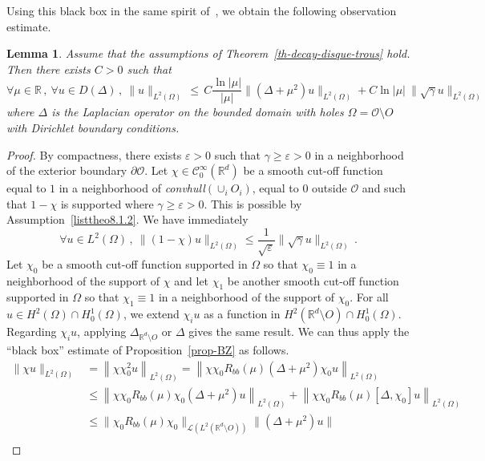 \documentclass[10pt]{amsart}
\newtheorem{lemm}[theo]{Lemma}\newtheorem{prop}[theo]{Proposition}\newtheorem{coro}[theo]{Corollary}\newtheorem{conj}[theo]{Conjecture}
\theoremstyle{definition}\newtheorem{defi}[theo]{Definition}\newtheorem{rema}[theo]{Remark}\newtheorem{exam}[theo]{Example}\newtheorem{exem}[theo]{Example}\newtheorem{nota}[theo]{Notation}
\newcommand{\RR}{\mathbb{R}}
\newcommand{\Cc}{\mathcal{C}}
\newcommand{\Lc}{\mathcal{L}}
\newcommand{\Oc}{\mathcal{O}}
\let\oldforall\forall
\renewcommand*{\forall}{\mathrel{\oldforall}}
\begin{document}
Using this black box in the same spirit of~\cite{Burq-Zworski}, we obtain the following observation estimate.

\begin{lemm}\label{lemma-BZ}
Assume that the assumptions of Theorem~\ref{th-decay-disque-trous} hold. Then there exists $C>0$ such that
\[
\forall \mu\in\RR\,,\:\forall u\in D(\Delta)\,,\:\|u\|_{L^2(\Omega)}\,\leq\,
C\frac {\ln |\mu|}{|\mu|} \|(\Delta+\mu^2)u\|_{L^2(\Omega)} + C{\ln |\mu|}\:
\|\sqrt{\gamma} u \|_{L^2(\Omega)}
\]
where $\Delta$ is the Laplacian operator on the bounded domain with holes $\Omega=\Oc\setminus O$ with Dirichlet boundary conditions.
\end{lemm}
\begin{proof}
By compactness, there exists $\varepsilon>0$ such that $\gamma\geq \varepsilon >0$ in a neighborhood of the exterior boundary $\partial \Oc$. Let $\chi\in\Cc^\infty_0(\RR^d)$ be a smooth cut-off function equal to $1$ in a neighborhood of \emph{convhull}$(\cup_i O_i)$, equal to $0$ outside $\Oc$ and such that $1-\chi$ is supported where $\gamma\geq \varepsilon >0$. This is possible by Assumption~\eqref{listtheo8.1.2}. We have immediately
\begin{equation}\label{eq-lemma-BZ-1}
\forall u\in L^2(\Omega)\,,\:\|(1-\chi) u\|_{L^2(\Omega)} \leq \frac 1{\sqrt{\varepsilon}} \|\sqrt{\gamma} u\|_{L^2(\Omega)}\,.
\end{equation}
Let $\chi_0$ be a smooth cut-off function supported in $\Omega$ so that $\chi_0\equiv 1$ in a neighborhood of the support of $\chi$ and let $\chi_1$ be another smooth cut-off function supported in $\Omega$ so that $\chi_1\equiv 1$ in a neighborhood of the support of $\chi_0$. For all $u\in H^2(\Omega)\cap H^1_0(\Omega)$, we extend $\chi_i u$ as a function in $H^2(\RR^d\setminus O)\cap H^1_0(\Omega)$. Regarding $\chi_i u$, applying $\Delta_{\RR^d\setminus O}$ or $\Delta$ gives the same result. We can thus apply the ``black box'' estimate of Proposition~\ref{prop-BZ} as follows.
\begin{align*}
\|\chi u\|_{L^2(\Omega)} & = \left\|\chi \chi_0^2 u\right\|_{L^2(\Omega)} = \left\|\chi\chi_0 R_{bb}(\mu)\left(\Delta+\mu^2\right)\chi_0 u\right\|_{L^2(\Omega)}\\
&\leq \left\|\chi\chi_0 R_{bb}(\mu)\chi_0\left(\Delta+\mu^2\right) u\right\|_{L^2(\Omega)} + \left\|\chi\chi_0 R_{bb}(\mu) [\Delta,\chi_0] u\right\|_{L^2(\Omega)}\\
&\leq \|\chi_0 R_{bb}(\mu)\chi_0\|_{\Lc\left(L^2(\RR^d\setminus O)\right)}
\|\left(\Delta+\mu^2\right)u\| \\

\end{align*}
\end{proof}
\end{document}
